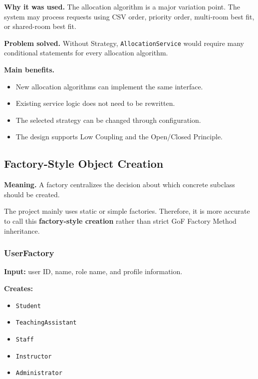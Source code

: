 \documentclass[12pt,a4paper]{article}
\begin{document}
\textbf{Why it was used.}
The allocation algorithm is a major variation point. The system may process
requests using CSV order, priority order, multi-room best fit, or shared-room
best fit.

\textbf{Problem solved.}
Without Strategy, \texttt{AllocationService} would require many conditional
statements for every allocation algorithm.

\textbf{Main benefits.}

\begin{itemize}
    \item New allocation algorithms can implement the same interface.
    \item Existing service logic does not need to be rewritten.
    \item The selected strategy can be changed through configuration.
    \item The design supports Low Coupling and the Open/Closed Principle.
\end{itemize}

\subsection{Factory-Style Object Creation}

\textbf{Meaning.}
A factory centralizes the decision about which concrete subclass should be
created.

The project mainly uses static or simple factories. Therefore, it is more
accurate to call this \textbf{factory-style creation} rather than strict GoF
Factory Method inheritance.

\subsubsection*{UserFactory}

\textbf{Input:} user ID, name, role name, and profile information.

\textbf{Creates:}

\begin{itemize}
    \item \texttt{Student}
    \item \texttt{TeachingAssistant}
    \item \texttt{Staff}
    \item \texttt{Instructor}
    \item \texttt{Administrator}
\end{itemize}
\end{document}
